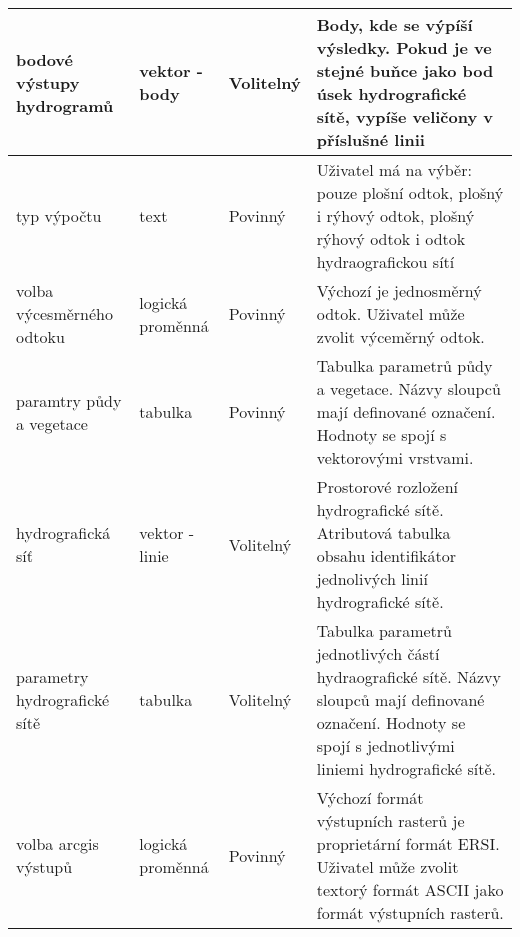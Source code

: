 \begin{sidewaystable}
{\begin{tabular}{lllp{7.5cm}}
bodové výstupy hydrogramů          & \cellcolor[HTML]{FCFF2F}vektor - body                 & Volitelný         & Body, kde se výpíší výsledky. Pokud je ve stejné buňce jako bod úsek hydrografické sítě, vypíše veličony v příslušné linii                                    \\ \hline
typ výpočtu                        & text                                                  & Povinný           & Uživatel má na výběr: pouze plošní odtok, plošný i rýhový odtok, plošný rýhový odtok i odtok hydraografickou sítí                                             \\ \hline
volba výcesměrného odtoku          & \cellcolor[HTML]{9698ED}logická proměnná              & Povinný           & Výchozí je jednosměrný odtok. Uživatel může zvolit výceměrný odtok.                                                                                           \\ \hline
paramtry půdy a vegetace           & \cellcolor[HTML]{67FD9A}tabulka                       & Povinný           & Tabulka parametrů půdy a vegetace. Názvy sloupců mají definované označení. Hodnoty se spojí s vektorovými vrstvami.                                           \\ \hline
hydrografická síť                  & \cellcolor[HTML]{F8FF00}vektor - linie                & Volitelný         & Prostorové rozložení hydrografické sítě. Atributová tabulka obsahu identifikátor jednolivých linií hydrografické sítě.                                        \\ \hline
parametry hydrografické sítě       & \cellcolor[HTML]{67FD9A}tabulka                       & Volitelný         & Tabulka parametrů jednotlivých částí hydraografické sítě. Názvy sloupců mají definované označení. Hodnoty se spojí s jednotlivými liniemi hydrografické sítě. \\ \hline
volba arcgis výstupů               & \cellcolor[HTML]{9698ED}logická proměnná              & Povinný           & Výchozí formát výstupních rasterů je proprietární formát ERSI. Uživatel může zvolit textorý formát ASCII jako formát výstupních rasterů.                      \\ \hline
\end{tabular}
}
\end{sidewaystable}
